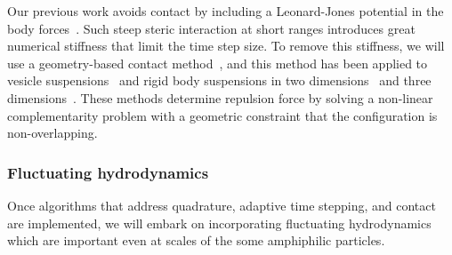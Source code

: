 Our previous work avoids contact by including a Leonard-Jones potential
in the body forces~\cite{Fu2018_SIAM}. Such steep steric interaction at
short ranges introduces great numerical stiffness that limit the time
step size. To remove this stiffness, we will use a geometry-based
contact method~\cite{har-pon-sor-zor2011}, and this method has been
applied to vesicle suspensions~\cite{lu-rah-zor2017} and rigid body
suspensions in two dimensions~\cite{bys-sha-qua2020} and
three dimensions~\cite{Yan2019}. These methods determine repulsion
force by solving a non-linear complementarity problem with a geometric
constraint that the configuration is non-overlapping.


\subsubsection{Fluctuating hydrodynamics}
\label{subsec:fluctuating}
Once algorithms that address quadrature, adaptive time stepping, and
contact are implemented, we will embark on incorporating fluctuating
hydrodynamics~\cite{Bao17,Bao18} which are important even at scales of
the some amphiphilic particles.





